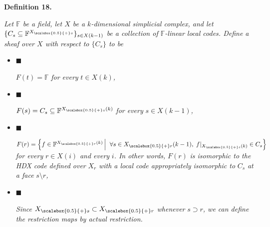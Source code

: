 

\par\medskip\noindent\textbf{
\textbf{Definition 18}\textbf{.}
}\par



\emph{Let $\mathbb{F}$ be a field, let $X$ be a $k$-dimensional simplicial complex, and let $\{C_{s}\subseteq\mathbb{F}^{{X}_{\scalebox{0.5}{+}s}}\}_{s\in X(k-1)}$ be a collection of $\mathbb{F}$-linear local codes. Define a sheaf over $X$ with respect to $\{C_{s}\}$ to be}\par


\begin{itemize}


\item[] 
$\blacksquare$ 


$F(t)=\mathbb{F}$\emph{ for every }$t\in X(k)$\emph{,}\par





\item[] 
$\blacksquare$ 


$F(s)=C_{s}\subseteq\mathbb{F}^{{X}_{\scalebox{0.5}{+}s}(k)}$\emph{ for every }$s\in X(k-1)$\emph{,}\par





\item[] 
$\blacksquare$ 


$F(r)=\left\{f\in\mathbb{F}^{{X}_{\scalebox{0.5}{+}r}(k)}\left|\;\vphantom{f\in\mathbb{F}^{{X}_{\scalebox{0.5}{+}r}(k)}\forall s\in{X}_{\scalebox{0.5}{+}r}(k-1),\;f|_{{X}_{\scalebox{0.5}{+}s}(k)}\in C_{s}}\right.\forall s\in{X}_{\scalebox{0.5}{+}r}(k-1),\;f|_{{X}_{\scalebox{0.5}{+}s}(k)}\in C_{s}\right\}$\emph{ for every }$r\in X(i)$\emph{ and every }$i$\emph{. In other words, }$F(r)$\emph{ is isomorphic to the HDX code defined over }$X_{r}$\emph{ with a local code appropriately isomorphic to }$C_{s}$\emph{ at a face }$s\setminus r$\emph{,}\par





\item[] 
$\blacksquare$ 


\emph{Since }${X}_{\scalebox{0.5}{+}s}\subset{X}_{\scalebox{0.5}{+}r}$\emph{ whenever }$s\supset r$\emph{, we can define the restriction maps by actual restriction.}\par





\end{itemize}



